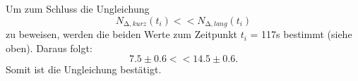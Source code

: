 Um zum Schluss die Ungleichung
\begin{equation*}
	N_{\increment, kurz}(t_i) << N_{\increment, lang}(t_i)
\end{equation*}
zu beweisen, werden die beiden Werte zum Zeitpunkt $t_i$ = 117s bestimmt (siehe oben).
Daraus folgt:
\begin{equation*}
	7.5 \pm 0.6 << 14.5 \pm 0.6 .
\end{equation*}
Somit ist die Ungleichung bestätigt.
	